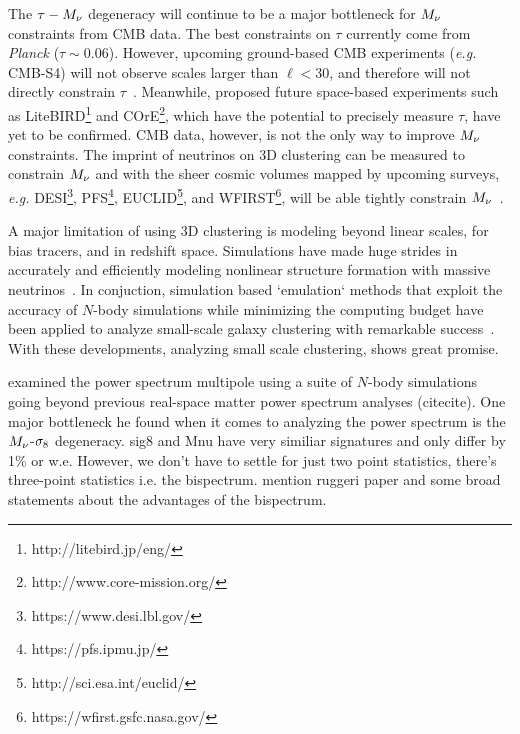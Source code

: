 The $\tau-M_\nu$ degeneracy will continue to be a major bottleneck 
for $M_\nu$ constraints from CMB data. The best constraints on $\tau$ 
currently come from {\em Planck} ($\tau\sim0.06$). However, upcoming 
ground-based CMB experiments ({\em e.g.} CMB-S4) will not observe scales 
larger than $\ell < 30$, and therefore will not directly constrain 
$\tau$~\citep{abazajian2016}. Meanwhile, proposed future space-based 
experiments such as LiteBIRD\footnote{http://litebird.jp/eng/} and 
COrE\footnote{http://www.core-mission.org/}, which have the potential 
to precisely measure $\tau$, have yet to be confirmed. CMB data, however, 
is not the only way to improve $M_\nu$ constraints. The imprint of 
neutrinos on 3D clustering can be measured to constrain $M_\nu$ and 
with the sheer cosmic volumes mapped by upcoming surveys, \emph{e.g.} 
DESI\footnote{https://www.desi.lbl.gov/}, PFS\footnote{https://pfs.ipmu.jp/}, 
EUCLID\footnote{http://sci.esa.int/euclid/}, and WFIRST\footnote{https://wfirst.gsfc.nasa.gov/}, 
will be able tightly constrain $M_\nu$~\citep{audren2013, font-ribera2014, petracca2016, sartoris2016, boyle2018}.

A major limitation of using 3D clustering is modeling beyond linear 
scales, for bias tracers, and in redshift space. Simulations have made
huge strides in accurately and efficiently modeling nonlinear structure
formation with massive neutrinos~\citep[\emph{e.g.}][]{brandbyge2008, 
villaescusa-navarro2013, castorina2015, adamek2017, emberson2017, villaescusa-navarro2018}. 
In conjuction, simulation based `emulation` methods that exploit the 
accuracy of $N$-body simulations while minimizing the computing budget 
have been applied to analyze small-scale galaxy clustering with remarkable 
success~\citep[\emph{e.g.}][]{heitmann2009, kwan2015, euclidcollaboration2018, mcclintock2018, zhai2018, wibking2019}. 
With these developments, analyzing 
small scale clustering, shows great promise. 

\cite{villaescusa-navarro2018} examined the power spectrum multipole 
using a suite of $N$-body simulations going beyond previous real-space 
matter power spectrum analyses (citecite). One major bottleneck he 
found when it comes to analyzing the power spectrum is the $M_\nu$-$\sigma_8$ degeneracy. 
sig8 and Mnu have very similiar signatures and only differ by 1\% or w.e. 
However, we don't have to settle for just two point statistics, there's three-point 
statistics i.e. the bispectrum. mention ruggeri paper and some broad statements about
the advantages of the bispectrum. 

